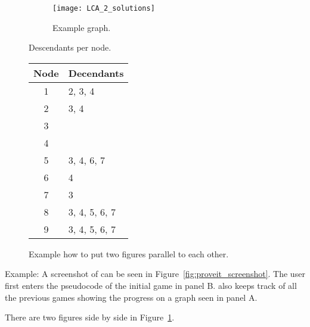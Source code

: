 \begin{figure} [htbp]
  \centering
\begin{subfigure}{0.45\textwidth}
\texttt{[image: LCA\_2\_solutions]}
\caption{Example graph.}
\end{subfigure}
\hfil
\begin{subtable}{0.3\textwidth}
\centering
\caption{Descendants per node.}
\begin{tabular}{cl}
  \toprule
	Node & Decendants \\
  \midrule
  1 & 2, 3, 4 \\
  2 & 3, 4 \\
  3 & \\
  4 & \\
  5 & 3, 4, 6, 7 \\
  6 & 4 \\
  7 & 3 \\
  8 & 3, 4, 5, 6, 7\\
  9 & 3, 4, 5, 6, 7\\
  \bottomrule
\end{tabular}
\end{subtable}
%
\caption{Example how to put two figures parallel to each other.}
\label{fig:LCA_2_solutions}
\end{figure}


Example: A screenshot of \proveit can be seen in Figure~\ref{fig:proveit_screenshot}. The user first enters the pseudocode of the initial game in panel B. \proveit also keeps track of all the previous games showing the progress on a graph seen in panel A.

There are two figures side by side in Figure~\ref{fig:LCA_2_solutions}.
